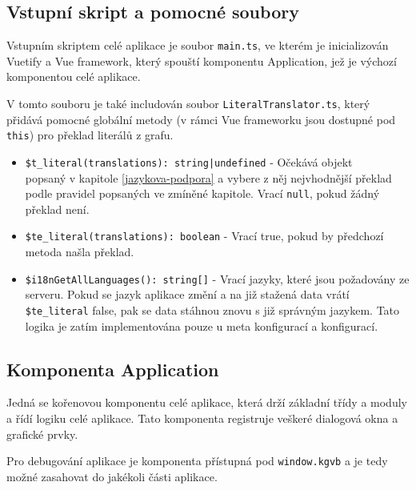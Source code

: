 \subsection{Vstupní skript a pomocné soubory}
Vstupním skriptem celé aplikace je soubor \texttt{main.ts}, ve kterém je inicializován Vuetify a Vue framework, který spouští komponentu Application, jež je výchozí komponentou celé aplikace.

V tomto souboru je také includován soubor \texttt{LiteralTranslator.ts}, který přidává pomocné globální metody (v rámci Vue frameworku jsou dostupné pod \texttt{this}) pro překlad literálů z grafu.

\begin{itemize}
  \item \texttt{\$t_literal(translations): string|undefined} - Očekává objekt \\popsaný v kapitole \ref{jazykova-podpora} a vybere z něj nejvhodnější překlad podle pravidel popsaných ve zmíněné kapitole. Vrací \texttt{null}, pokud žádný překlad není.

  \item \texttt{\$te_literal(translations): boolean} - Vrací true, pokud by předchozí metoda našla překlad.

  \item \texttt{\$i18nGetAllLanguages(): string[]} - Vrací jazyky, které jsou požadovány ze serveru. Pokud se jazyk aplikace změní a na již stažená data vrátí \texttt{\$te_literal} false, pak se data stáhnou znovu s již správným jazykem. Tato logika je zatím implementována pouze u meta konfigurací a konfigurací.
\end{itemize}

\subsection{Komponenta Application}
Jedná se kořenovou komponentu celé aplikace, která drží základní třídy a moduly a řídí logiku celé aplikace. Tato komponenta registruje veškeré dialogová okna a grafické prvky.

Pro debugování aplikace je komponenta přístupná pod \texttt{window.kgvb} a je tedy možné zasahovat do jakékoli části aplikace.

